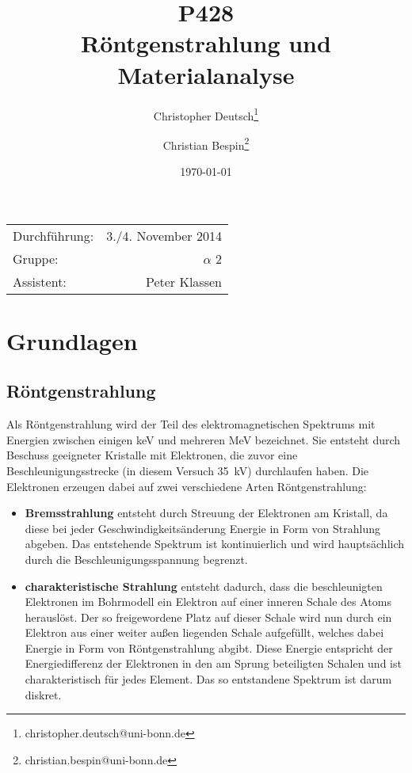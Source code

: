 \documentclass[10pt, a4paper]{article}
\title{P428 \\ Röntgenstrahlung und Materialanalyse}
\author{Christopher Deutsch\footnote{christopher.deutsch@uni-bonn.de} \and Christian Bespin\footnote{christian.bespin@uni-bonn.de}}
\date{\today}
\begin{document}
\maketitle

\begin{center}
\begin{tabular}{l r}
Durchführung: & 3./4. November 2014 \\
Gruppe: & $\alpha$ 2 \\
Assistent: & Peter Klassen
\end{tabular}
\end{center}

\begin{abstract}
\noindent
\end{abstract}

\tableofcontents
\newpage


\section{Grundlagen}
\subsection{Röntgenstrahlung}
  Als Röntgenstrahlung wird der Teil des elektromagnetischen Spektrums mit Energien zwischen einigen keV und mehreren MeV \cite{demtroeder} bezeichnet.
  Sie entsteht durch Beschuss geeigneter Kristalle mit Elektronen, die zuvor eine Beschleunigungsstrecke (in diesem Versuch \SI{35}{\kilo\volt}) durchlaufen haben.
  Die Elektronen erzeugen dabei auf zwei verschiedene Arten Röntgenstrahlung:
  \begin{itemize}
  \item \textbf{Bremsstrahlung} entsteht durch Streuung der Elektronen am Kristall, da diese bei jeder Geschwindigkeitsänderung Energie in Form von Strahlung abgeben.
  Das entstehende Spektrum ist kontinuierlich und wird hauptsächlich durch die Beschleunigungsspannung begrenzt.
  \item \textbf{charakteristische Strahlung} entsteht dadurch, dass die beschleunigten Elektronen im Bohrmodell ein Elektron auf einer inneren Schale des Atoms herauslöst.
  Der so freigewordene Platz auf dieser Schale wird nun durch ein Elektron aus einer weiter außen liegenden Schale aufgefüllt, welches dabei Energie in Form von Röntgenstrahlung abgibt.
  Diese Energie entspricht der Energiedifferenz der Elektronen in den am Sprung beteiligten Schalen und ist charakteristisch für jedes Element.
  Das so entstandene Spektrum ist darum diskret.
  \end{itemize}
 
\end{document}
